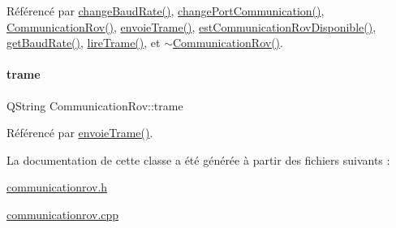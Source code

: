 Référencé par \hyperlink{class_communication_rov_ac49ffc6f2e6ae22ea9f99e10ca0a4163}{change\+Baud\+Rate()}, \hyperlink{class_communication_rov_ad46397a58ba7704fbd5ac5748e083004}{change\+Port\+Communication()}, \hyperlink{class_communication_rov_a22b64c69228d392a212f543e071adc02}{Communication\+Rov()}, \hyperlink{class_communication_rov_ac243fcfb073f4ceaf58fab1d41207801}{envoie\+Trame()}, \hyperlink{class_communication_rov_a513c26b04745fa2ae31b4533d656dfd4}{est\+Communication\+Rov\+Disponible()}, \hyperlink{class_communication_rov_a810de691dfc6d305f77c92ccd90bb6db}{get\+Baud\+Rate()}, \hyperlink{class_communication_rov_a5822d2f41553221ea876ea09e148f859}{lire\+Trame()}, et \hyperlink{class_communication_rov_a97e96f47dad6d47cbec4adc82756b49e}{$\sim$\+Communication\+Rov()}.

\mbox{\label{class_communication_rov_a7100b1be33860d235b45efd9010ac218}} 
\paragraph{\texorpdfstring{trame}{trame}}
{\footnotesize\ttfamily Q\+String Communication\+Rov\+::trame\hspace{0.3cm}{\ttfamily [private]}}



Référencé par \hyperlink{class_communication_rov_ac243fcfb073f4ceaf58fab1d41207801}{envoie\+Trame()}.



La documentation de cette classe a été générée à partir des fichiers suivants \+:\begin{DoxyCompactItemize}
\item 
\hyperlink{communicationrov_8h}{communicationrov.\+h}\item 
\hyperlink{communicationrov_8cpp}{communicationrov.\+cpp}\end{DoxyCompactItemize}
